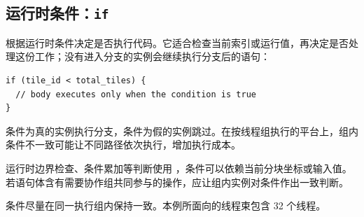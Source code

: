 \subsection*{运行时条件：\texttt{if}}

\co@if@ 根据运行时条件决定是否执行代码。它适合检查当前索引或运行值，再决定是否处理这份工作；没有进入分支的实例会继续执行分支后的语句：

\begin{lstlisting}[language=croqtile,caption={用 if 做谓词执行}]
if (tile_id < total_tiles) {
  // body executes only when the condition is true
}
\end{lstlisting}

条件为真的实例执行分支，条件为假的实例跳过。在按线程组执行的平台上，组内条件不一致可能让不同路径依次执行，增加执行成本。

运行时边界检查、条件累加等判断使用 \co@if@，条件可以依赖当前分块坐标或输入值。若语句体含有需要协作组共同参与的操作，应让组内实例对条件作出一致判断。

条件尽量在同一执行组内保持一致。本例所面向的线程束包含 32 个线程。
